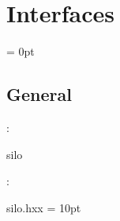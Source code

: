 
\section{Interfaces} 


\parskip = 0pt

\vspace{3mm} \subsection*{General}

: 

silo
\vspace{2mm}

\vspace{5mm}

: 



silo.hxx
\vspace{2mm}\parskip = 10pt 
